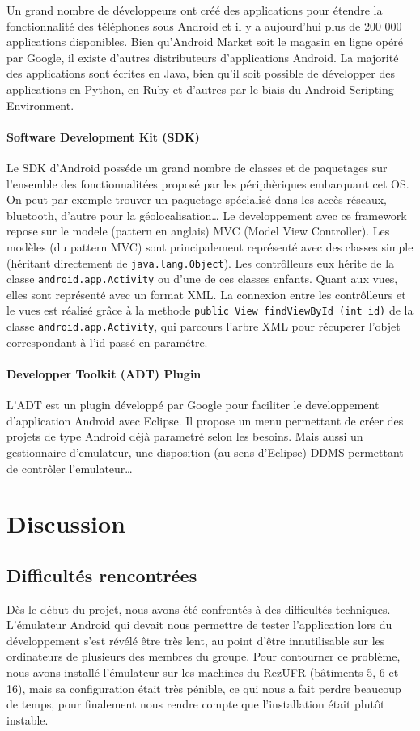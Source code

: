 \documentclass[a4paper,11pt,french]{article}
\def\android{Android\texttrademark{}}
\begin{document}
Un grand nombre de développeurs ont créé des applications pour étendre la fonctionnalité des téléphones sous \android{} et il y a aujourd'hui
plus de 200 000 applications disponibles. Bien qu'\android{} Market soit le magasin en ligne opéré par Google, il existe d'autres distributeurs
d'applications \android{}. La majorité des applications sont écrites en Java, bien qu'il soit possible de développer des applications en
Python, en Ruby et d'autres par le biais du \android{} Scripting Environment.

\paragraph{Software Development Kit (SDK)}
Le SDK d'\android{} posséde un grand nombre de classes et de paquetages sur l'ensemble des fonctionnalitées proposé par les périphèriques embarquant cet OS. On peut par exemple trouver un paquetage spécialisé dans les accès réseaux, bluetooth, d'autre pour la géolocalisation\dots{} Le developpement avec ce framework repose sur le modele (pattern en anglais) MVC (Model View Controller). Les modèles (du pattern MVC) sont principalement représenté avec des classes simple (héritant directement de \verb!java.lang.Object!). Les contrôlleurs eux hérite de la classe \verb!android.app.Activity! ou d'une de ces classes enfants. Quant aux vues, elles sont représenté avec un format XML.
La connexion entre les contrôlleurs et le vues est réalisé grâce à la methode \verb!public View findViewById (int id)! de la classe \verb!android.app.Activity!, qui parcours l'arbre XML pour récuperer l'objet correspondant à l'id passé en paramétre.

\paragraph{Developper Toolkit (ADT) Plugin}
L'ADT est un plugin développé par Google pour faciliter le developpement d'application \android{} avec Eclipse. Il propose un menu permettant de créer des projets de type \android{} déjà parametré selon les besoins. Mais aussi un gestionnaire d'emulateur, une disposition (au sens d'Eclipse) DDMS permettant de contrôler l'emulateur\dots{}

\section{Discussion}
\subsection{Difficultés rencontrées}
\label{sec:difficultes}
Dès le début du projet, nous avons été confrontés à des difficultés techniques. L'émulateur \android{} qui devait nous permettre de tester
l'application lors du développement s'est révélé être très lent, au point d'être innutilisable sur les ordinateurs de plusieurs des membres
du groupe. Pour contourner ce problème, nous avons installé l'émulateur sur les machines du RezUFR (bâtiments 5, 6 et 16), mais sa
configuration était très pénible, ce qui nous a fait perdre beaucoup de temps, pour finalement nous rendre compte que l'installation était
plutôt instable.
\end{document}
